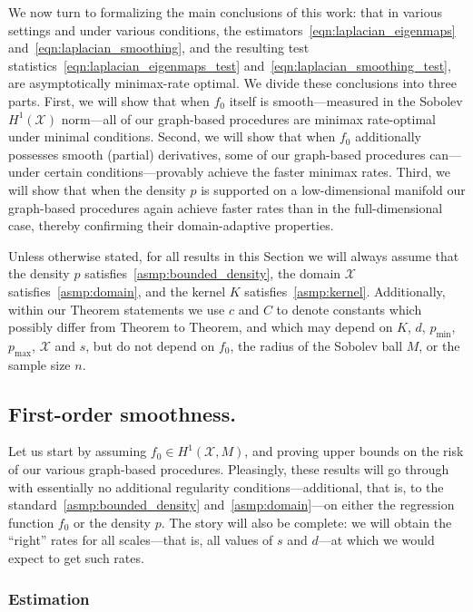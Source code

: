 \documentclass{article}
\newcommand{\1}{\mathbf{1}}
\newcommand{\Xset}{\mathcal{X}}
\theoremstyle{alden}
\theoremstyle{aldenthm}
\theoremstyle{definition}
\theoremstyle{remark}
\begin{document}
We now turn to formalizing the main conclusions of this work: that in various settings and under various conditions, the estimators~\eqref{eqn:laplacian_eigenmaps} and~\eqref{eqn:laplacian_smoothing}, and the resulting test statistics~\eqref{eqn:laplacian_eigenmaps_test} and~\eqref{eqn:laplacian_smoothing_test}, are asymptotically minimax-rate optimal. We divide these conclusions into three parts. First, we will show that when $f_0$ itself is smooth---measured in the Sobolev $H^1(\Xset)$ norm---all of our graph-based procedures are minimax rate-optimal under minimal conditions. Second, we will show that when $f_0$ additionally possesses smooth (partial) derivatives, some of our graph-based procedures can---under certain conditions---provably achieve the faster minimax rates. Third, we will show that when the density $p$ is supported on a low-dimensional manifold our graph-based procedures again achieve faster rates than in the full-dimensional case, thereby confirming their domain-adaptive properties. 

Unless otherwise stated, for all results in this Section we will always assume that the density $p$ satisfies~\ref{asmp:bounded_density}, the domain $\Xset$ satisfies~\ref{asmp:domain}, and the kernel $K$ satisfies~\ref{asmp:kernel}. Additionally, within our Theorem statements we use $c$ and $C$ to denote constants which possibly differ from Theorem to Theorem,  and which may depend on $K$, $d$, $p_{\min}$, $p_{\max}$, $\Xset$ and $s$, but do not depend on $f_0$, the radius of the Sobolev ball $M$, or the sample size $n$.

\subsection{First-order smoothness.}
\label{subsec:minimax_first_order_smoothness}
Let us start by assuming $f_0 \in H^1(\Xset,M)$, and proving upper bounds on the risk of our various graph-based procedures. Pleasingly, these results will go through with essentially no additional regularity conditions---additional, that is, to the standard~\ref{asmp:bounded_density} and~\ref{asmp:domain}---on either the regression function $f_0$ or the density $p$. The story will also be complete: we will obtain the ``right'' rates for all scales---that is, all values of $s$ and $d$---at which we would expect to get such rates.

\subsubsection{Estimation}
\label{subsubsec:first_order_smoothness_estimation}
\end{document}
